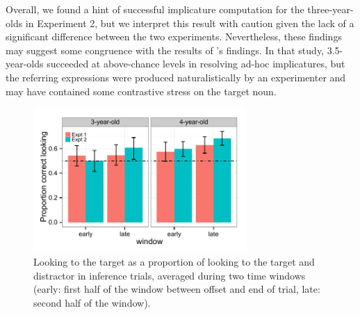 \documentclass[10pt,letterpaper]{article}
\begin{document}
Overall, we found a hint of successful implicature computation for the three-year-olds in Experiment 2, but we interpret this result with caution given the lack of a significant difference between the two experiments. Nevertheless, these findings may suggest some congruence with the results of 's findings. In that study, 3.5-year-olds succeeded at above-chance levels in resolving ad-hoc implicatures, but the referring expressions were produced naturalistically by an experimenter and may have contained some contrastive stress on the target noun. 




\begin{figure}[h!]
\begin{center} 
\includegraphics[width=3.2in]{figures/expt12-accuracy_inf.pdf}
\caption{\label{fig:0prosbar} Looking to the target as a proportion of looking to the target and distractor in inference trials, averaged during two time windows (early: first half of the window between offset and end of trial, late: second half of the window).}
\end{center} 
\end{figure}
\end{document}
